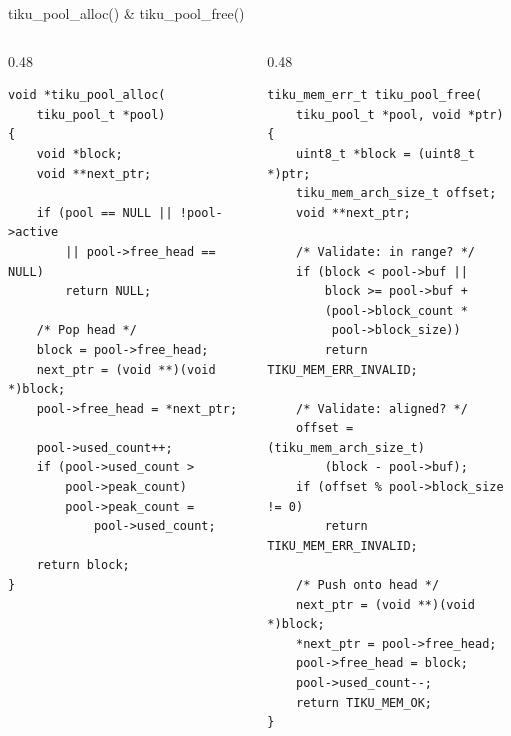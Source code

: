 \documentclass[aspectratio=169, 10pt]{beamer}
\begin{document}
\begin{frame}[fragile]{tiku\_pool\_alloc() \& tiku\_pool\_free()}
\begin{columns}[T]
\begin{column}{0.48\textwidth}
\begin{lstlisting}[style=cstyle, title={Alloc --- O(1), pop freelist}]
void *tiku_pool_alloc(
    tiku_pool_t *pool)
{
    void *block;
    void **next_ptr;

    if (pool == NULL || !pool->active
        || pool->free_head == NULL)
        return NULL;

    /* Pop head */
    block = pool->free_head;
    next_ptr = (void **)(void *)block;
    pool->free_head = *next_ptr;

    pool->used_count++;
    if (pool->used_count >
        pool->peak_count)
        pool->peak_count =
            pool->used_count;

    return block;
}
\end{lstlisting}
\end{column}

\begin{column}{0.48\textwidth}
\begin{lstlisting}[style=cstyle, title={Free --- O(1), push freelist}]
tiku_mem_err_t tiku_pool_free(
    tiku_pool_t *pool, void *ptr)
{
    uint8_t *block = (uint8_t *)ptr;
    tiku_mem_arch_size_t offset;
    void **next_ptr;

    /* Validate: in range? */
    if (block < pool->buf ||
        block >= pool->buf +
        (pool->block_count *
         pool->block_size))
        return TIKU_MEM_ERR_INVALID;

    /* Validate: aligned? */
    offset = (tiku_mem_arch_size_t)
        (block - pool->buf);
    if (offset % pool->block_size != 0)
        return TIKU_MEM_ERR_INVALID;

    /* Push onto head */
    next_ptr = (void **)(void *)block;
    *next_ptr = pool->free_head;
    pool->free_head = block;
    pool->used_count--;
    return TIKU_MEM_OK;
}
\end{lstlisting}
\end{column}
\end{columns}
\end{frame}
\end{document}
